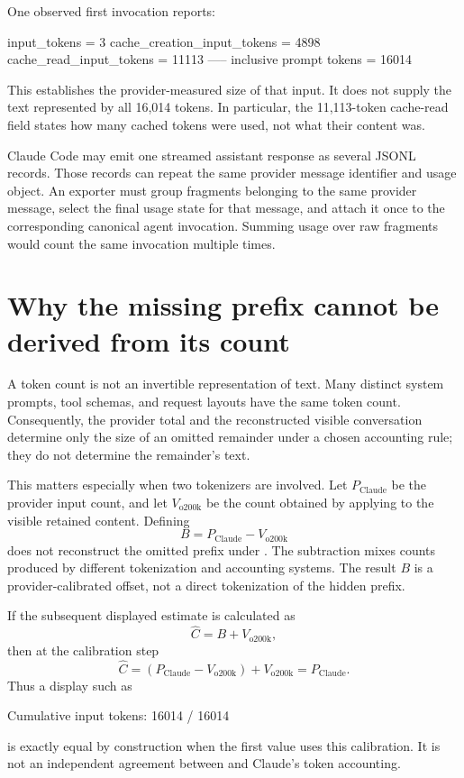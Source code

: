 \documentclass[11pt]{article}
\begin{document}
One observed first invocation reports:
\begin{DocCode}
input_tokens                 =     3
cache_creation_input_tokens  =  4898
cache_read_input_tokens      = 11113
                                 -----
inclusive prompt tokens      = 16014
\end{DocCode}
This establishes the provider-measured size of that input.  It does not supply the
text represented by all 16,014 tokens.  In particular, the 11,113-token cache-read
field states how many cached tokens were used, not what their content was.

Claude Code may emit one streamed assistant response as several JSONL records.
Those records can repeat the same provider message identifier and usage object.
An exporter must group fragments belonging to the same provider message, select
the final usage state for that message, and attach it once to the corresponding
canonical agent invocation.  Summing usage over raw fragments would count the same
invocation multiple times.


\section*{Why the missing prefix cannot be derived from its count}

A token count is not an invertible representation of text.  Many distinct system
prompts, tool schemas, and request layouts have the same token count.  Consequently,
the provider total and the reconstructed visible conversation determine only the
size of an omitted remainder under a chosen accounting rule; they do not determine
the remainder's text.

This matters especially when two tokenizers are involved.  Let
\(P_{\mathrm{Claude}}\) be the provider input count, and let
\(V_{\mathrm{o200k}}\) be the count obtained by applying
 to the visible retained content.  Defining
\[
  B = P_{\mathrm{Claude}} - V_{\mathrm{o200k}}
\]
does not reconstruct the omitted prefix under .  The subtraction
mixes counts produced by different tokenization and accounting systems.  The result
\(B\) is a provider-calibrated offset, not a direct tokenization of the hidden
prefix.

If the subsequent displayed estimate is calculated as
\[
  \widehat{C} = B + V_{\mathrm{o200k}},
\]
then at the calibration step
\[
  \widehat{C}
  = (P_{\mathrm{Claude}} - V_{\mathrm{o200k}})
    + V_{\mathrm{o200k}}
  = P_{\mathrm{Claude}}.
\]
Thus a display such as
\begin{DocCode}
Cumulative input tokens: 16014 / 16014
\end{DocCode}
is exactly equal by construction when the first value uses this calibration.
It is not an independent agreement between  and Claude's token
accounting.
\end{document}
